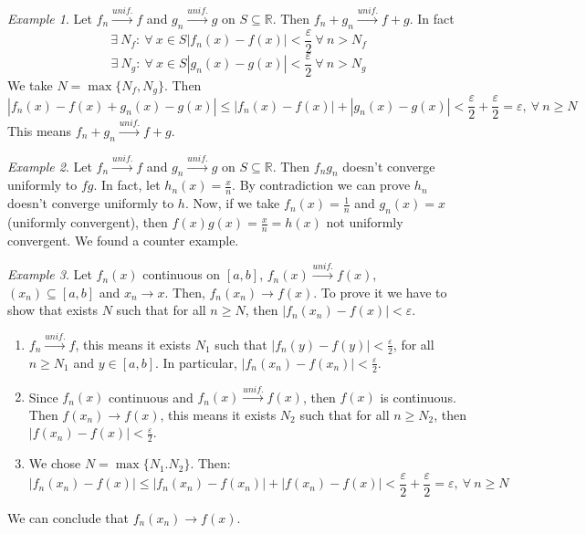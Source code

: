 \documentclass{article}
\newcommand{\abs}[1]{\left|#1\right|}
\newenvironment{enumarabic}{\begin{enumerate}[label=(\arabic*)]}{\end{enumerate}}
\newcommand{\intcc}[1]{\left[#1\right]}
\newcommand{\tounif}{\xrightarrow{unif.}}
\theoremstyle{definition}
\theoremstyle{definition}
\theoremstyle{plain}
\theoremstyle{plain}
\theoremstyle{plain}
\theoremstyle{plain}
\theoremstyle{definition}
\theoremstyle{remark}
\theoremstyle{remark}
\theoremstyle{remark}
\newtheorem{examplet}{Example}[theorem]
\theoremstyle{remark}
\newcommand{\R}{\mathbb{R}}
\newcommand{\ForAll}{\ \forall \ }
\newcommand{\Exists}{\ \exists \ }
\newcommand{\E}{\varepsilon}
\begin{document}
\begin{examplet}
  Let $f_n \tounif f$ and $g_n \tounif g$ on $S \subseteq \R$. Then $f_n + g_n \tounif f + g$. In fact
  \[
  \Exists N_f : \ForAll x \in S \abs{f_n(x) - f(x)} < \frac{\E}{2} \ForAll n > N_f
  \]
  \[
  \Exists N_g : \ForAll x \in S \abs{g_n(x) - g(x)} < \frac{\E}{2} \ForAll n > N_g
  \]
  We take $N = \max \{ N_f, N_g \}$. Then
  \[
  \abs{f_n(x) - f(x) + g_n(x) - g(x)} \leq \abs{f_n(x) - f(x)} + \abs{g_n(x) - g(x)} < \frac{\E}{2} + \frac{\E}{2} = \E, \ForAll n \geq N
  \]
  This means $f_n + g_n \tounif f + g$.
\end{examplet}

\begin{examplet}
  Let $f_n \tounif f$ and $g_n \tounif g$ on $S \subseteq \R$. Then $f_n g_n$ doesn't converge uniformly to $fg$. In fact, let $h_n(x) = \frac{x}{n}$. By contradiction we can prove $h_n$ doesn't converge uniformly to $h$. Now, if we take $f_n(x) = \frac{1}{n}$ and $g_n(x) = x$ (uniformly convergent), then $f(x) g(x) = \frac{x}{n} = h(x)$ not uniformly convergent. We found a counter example.
\end{examplet}

\begin{examplet}
  Let $f_n(x)$ continuous on $\intcc{a,b}$, $f_n(x) \tounif f(x)$, $(x_n) \subseteq \intcc{a,b}$ and $x_n \to x$. Then, $f_n(x_n) \to f(x)$. To prove it we have to show that exists $N$ such that for all $n \geq N$, then $\abs{f_n(x_n) - f(x)} < \E$.
  \begin{enumarabic}
  \item $f_n \tounif f$, this means it exists $N_1$ such that $\abs{f_n(y) - f(y)} < \frac{\E}{2}$, for all $n \geq N_1$ and $y \in \intcc{a,b}$. In particular, $\abs{f_n(x_n) - f(x_n)} < \frac{\E}{2}$.
  \item Since $f_n(x)$ continuous and $f_n(x) \tounif f(x)$, then $f(x)$ is continuous. Then $f(x_n) \to f(x)$, this means it exists $N_2$ such that for all $n \geq N_2$, then $\abs{f(x_n) - f(x)} < \frac{\E}{2}$.
  \item We chose $N = \max \{ N_1. N_2 \}$. Then:
    \[
    \abs{f_n(x_n) - f(x)} \leq \abs{f_n(x_n) - f(x_n)} + \abs{f(x_n) - f(x)} <
    \frac{\E}{2} + \frac{\E}{2} = \E, \ForAll n \geq N
    \]
  \end{enumarabic}
  We can conclude that $f_n(x_n) \to f(x)$.
\end{examplet}


\newpage
\end{document}
